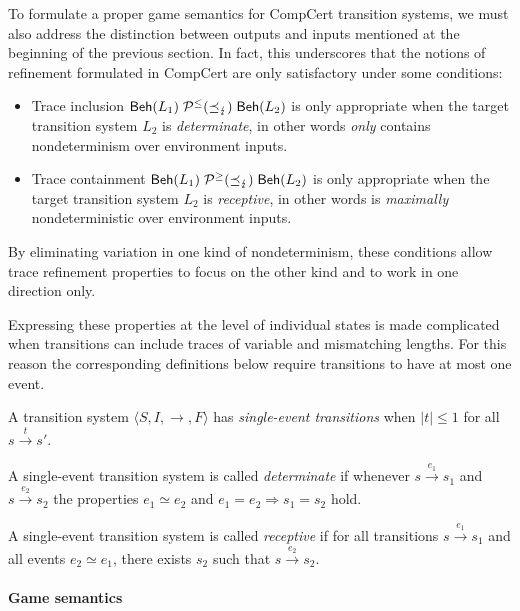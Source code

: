 \documentclass[acmsmall,review,anonymous]{acmart}\settopmatter{printfolios=true,printccs=false,printacmref=false}
\begin{document}
To formulate a proper game semantics for
CompCert transition systems,
we must also address the distinction between
outputs and inputs mentioned
at the beginning of the previous section.
In fact,
this underscores that
the notions of refinement
formulated in CompCert
are only satisfactory under some conditions:
\begin{itemize}
  \item
    Trace inclusion
    $ \mathsf{Beh} (L_1)
     \mathrel{\mathcal{P}^\le(\preceq_\lightning)}
      \mathsf{Beh} (L_2)$
    is only appropriate when
    the target transition system $L_2$
    is \emph{determinate},
    in other words \emph{only} contains nondeterminism
    over environment inputs.
  \item
    Trace containment
    $ \mathsf{Beh} (L_1)
     \mathrel{\mathcal{P}^\ge(\preceq_\lightning)}
      \mathsf{Beh} (L_2)$
    is only appropriate when
    the target transition system $L_2$
    is \emph{receptive},
    in other words is \emph{maximally} nondeterministic
    over environment inputs.
\end{itemize}
By eliminating variation in one kind of nondeterminism,
these conditions allow trace refinement properties
to focus on the other kind
and to work in one direction only.

Expressing these properties at the level of individual states
is made complicated when transitions can include
traces of variable and mismatching lengths.
For this reason the corresponding definitions below
require transitions to have at most one event.

\begin{definition} %
A transition system
$\langle S, I, {\rightarrow}, F \rangle$
has \emph{single-event transitions}
when $|t| \le 1$ for all $s \stackrel{t}{\rightarrow} s'$.

A single-event transition system is called
\emph{determinate}
if whenever
$s \stackrel{e_1}{\longrightarrow} s_1$ and
$s \stackrel{e_2}{\longrightarrow} s_2$
the properties $e_1 \simeq e_2$ and $e_1 = e_2 \Rightarrow s_1 = s_2$ hold.

A single-event transition system is called
\emph{receptive}
if for all transitions $s \stackrel{e_1}{\longrightarrow} s_1$
and all events $e_2 \simeq e_1$,
there exists $s_2$ such that
$s \stackrel{e_2}{\longrightarrow} s_2$.
\end{definition}

\paragraph{Game semantics}
\end{document}
